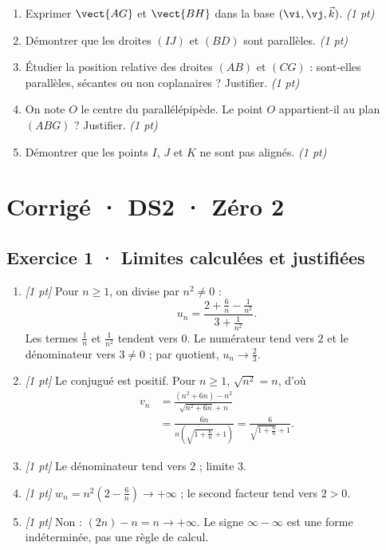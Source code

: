 \begin{enumerate}

\item Exprimer $\vect{AG}$ et $\vect{BH}$ dans la base $(\vi,\vj,\vec k)$. \hfill\textit{(1 pt)}

\item Démontrer que les droites $(IJ)$ et $(BD)$ sont parallèles. \hfill\textit{(1 pt)}

\item Étudier la position relative des droites $(AB)$ et $(CG)$ : sont-elles parallèles, sécantes ou non coplanaires ? Justifier. \hfill\textit{(1 pt)}

\item On note $O$ le centre du parallélépipède. Le point $O$ appartient-il au plan $(ABG)$ ? Justifier. \hfill\textit{(1 pt)}

\item Démontrer que les points $I$, $J$ et $K$ ne sont pas alignés. \hfill\textit{(1 pt)}

\end{enumerate}

\ifprof\clearpage

\section*{Corrigé · DS2 · Zéro 2}\label{cor:2-2}

\subsection*{Exercice 1 · Limites calculées et justifiées}\begin{enumerate}

\item \textit{[1 pt]} Pour $n\ge1$, on divise par $n^2\ne0$ :
\[u_n=\frac{2+\frac{6}{n}-\frac{1}{n^2}}{3+\frac{1}{n^2}}.\]
Les termes $\frac{1}{n}$ et $\frac{1}{n^2}$ tendent vers $0$. Le numérateur tend vers $2$ et le dénominateur vers $3\ne0$ ; par quotient, $u_n\to\frac{2}{3}$.

\item \textit{[1 pt]} Le conjugué est positif. Pour $n\ge1$, $\sqrt{n^2}=n$, d'où
\[\begin{aligned}v_n&=\frac{(n^2+6n)-n^2}{\sqrt{n^2+6n}+n}\\&=\frac{6n}{n(\sqrt{1+\frac{6}{n}}+1)}=\frac{6}{\sqrt{1+\frac{6}{n}}+1}.\end{aligned}\]

\item \textit{[1 pt]} Le dénominateur tend vers $2$ ; limite $3$.

\item \textit{[1 pt]} $w_n=n^2(2-\frac{6}{n})\to+\infty$ ; le second facteur tend vers $2>0$.

\item \textit{[1 pt]} Non : $(2n)-n=n\to+\infty$. Le signe $\infty-\infty$ est une forme indéterminée, pas une règle de calcul.

\end{enumerate}

